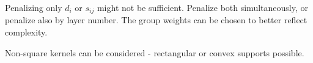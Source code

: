 Penalizing only $d_i$ or $s_{ij}$ might not be sufficient. Penalize both simultaneously, or penalize also by layer number. The group weights can be chosen to better reflect complexity.

Non-square kernels can be considered - rectangular or convex supports possible.



